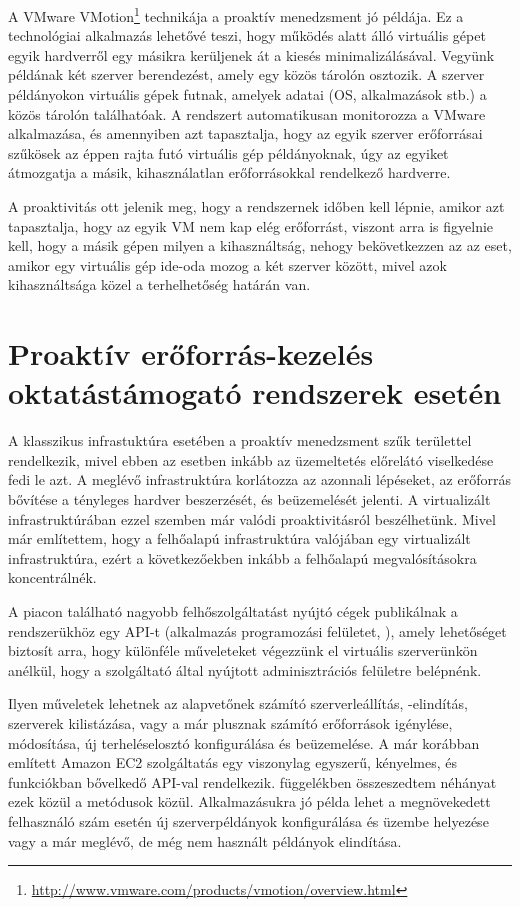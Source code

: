 A VMware VMotion\footnote{\href{http://www.vmware.com/products/vmotion/overview.html}{http://www.vmware.com/products/vmotion/overview.html}} technikája a proaktív menedzsment jó példája. Ez a technológiai alkalmazás lehetővé teszi, hogy működés alatt álló virtuális gépet egyik hardverről egy másikra kerüljenek át a kiesés minimalizálásával. Vegyünk példának két szerver berendezést, amely egy közös tárolón osztozik. A szerver példányokon virtuális gépek futnak, amelyek adatai (OS, alkalmazások stb.) a közös tárolón találhatóak. A rendszert automatikusan monitorozza a VMware alkalmazása, és amennyiben azt tapasztalja, hogy az egyik szerver erőforrásai szűkösek az éppen rajta futó virtuális gép példányoknak, úgy az egyiket átmozgatja a másik, kihasználatlan erőforrásokkal rendelkező hardverre.

A proaktivitás ott jelenik meg, hogy a rendszernek időben kell lépnie, amikor azt tapasztalja, hogy az egyik VM nem kap elég erőforrást, viszont arra is figyelnie kell, hogy a másik gépen milyen a kihasználtság, nehogy bekövetkezzen az az eset, amikor egy virtuális gép ide-oda mozog a két szerver között, mivel azok kihasználtsága közel a terhelhetőség határán van.

\section{Proaktív erőforrás-kezelés oktatástámogató rendszerek esetén}

A klasszikus infrastuktúra esetében a proaktív menedzsment szűk területtel rendelkezik, mivel ebben az esetben inkább az üzemeltetés előrelátó viselkedése fedi le azt. A meglévő infrastruktúra korlátozza az azonnali lépéseket, az erőforrás bővítése a tényleges hardver beszerzését, és beüzemelését jelenti. A virtualizált infrastruktúrában ezzel szemben már valódi proaktivitásról beszélhetünk. Mivel már említettem, hogy a felhőalapú infrastruktúra valójában egy virtualizált infrastruktúra, ezért a következőekben inkább a felhőalapú megvalósításokra koncentrálnék.

A piacon található nagyobb felhőszolgáltatást nyújtó cégek publikálnak a rendszerükhöz egy API-t (alkalmazás programozási felületet, ), amely lehetőséget biztosít arra, hogy különféle műveleteket végezzünk el virtuális szerverünkön anélkül, hogy a szolgáltató által nyújtott adminisztrációs felületre belépnénk.

Ilyen műveletek lehetnek az alapvetőnek számító szerverleállítás, -elindítás, szerverek kilistázása, vagy a már plusznak számító erőforrások igénylése, módosítása, új terheléselosztó konfigurálása és beüzemelése. A már korábban említett Amazon EC2 szolgáltatás egy viszonylag egyszerű, kényelmes, és funkciókban bővelkedő API-val rendelkezik.  függelékben összeszedtem néhányat ezek közül a metódusok közül. Alkalmazásukra jó példa lehet a megnövekedett felhasználó szám esetén új szerverpéldányok konfigurálása és üzembe helyezése vagy a már meglévő, de még nem használt példányok elindítása.

